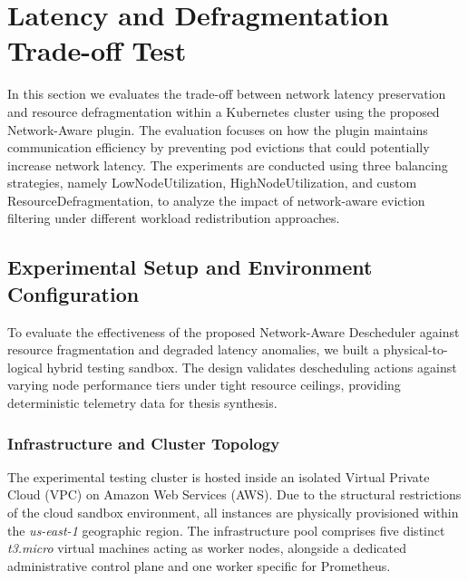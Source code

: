 \section{Latency and Defragmentation Trade-off Test}
\label{sec:netaware4_test}
In this section we evaluates the trade-off between network latency preservation and resource defragmentation within a Kubernetes cluster using the proposed Network-Aware plugin. The evaluation focuses on how the plugin maintains communication efficiency by preventing pod evictions that could potentially increase network latency. The experiments are conducted using three balancing strategies, namely LowNodeUtilization, HighNodeUtilization, and custom ResourceDefragmentation, to analyze the impact of network-aware eviction filtering under different workload redistribution approaches.

\subsection{Experimental Setup and Environment Configuration}
\label{subsec:netaware4_experimentsetup}
To evaluate the effectiveness of the proposed Network-Aware Descheduler against resource fragmentation and degraded latency anomalies, we built a physical-to-logical hybrid testing sandbox. The design validates descheduling actions against varying node performance tiers under tight resource ceilings, providing deterministic telemetry data for thesis synthesis.

\subsubsection{Infrastructure and Cluster Topology}
\label{subsubsec:netaware4_infrasetup}
The experimental testing cluster is hosted inside an isolated Virtual Private Cloud (VPC) on Amazon Web Services (AWS). Due to the structural restrictions of the cloud sandbox environment, all instances are physically provisioned within the \textit{us-east-1} geographic region. The infrastructure pool comprises five distinct \textit{t3.micro} virtual machines acting as worker nodes, alongside a dedicated administrative control plane and one worker specific for Prometheus.  

